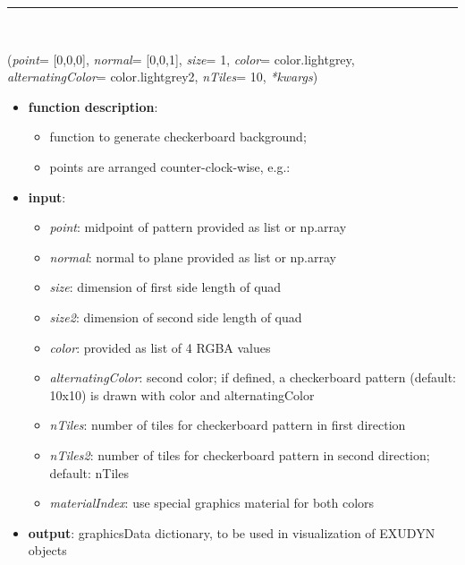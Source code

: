 \begin{itemize}[leftmargin=1.4cm]
\begin{itemize}[leftmargin=1.4cm]
\begin{itemize}[leftmargin=1.4cm]
\begin{itemize}[leftmargin=0.5cm]
\begin{itemize}[leftmargin=1.4cm]
\begin{itemize}[leftmargin=1.4cm]
\begin{itemize}[leftmargin=1.4cm]
\begin{itemize}[leftmargin=0.5cm]
\begin{itemize}[leftmargin=1.4cm]
%
\noindent\rule{8cm}{0.75pt}\vspace{1pt} \\ 
\begin{flushleft}
\label{sec:graphics:CheckerBoard}
({\it point}= [0,0,0], {\it normal}= [0,0,1], {\it size}= 1, {\it color}= color.lightgrey, {\it alternatingColor}= color.lightgrey2, {\it nTiles}= 10, {\it **kwargs})
\end{flushleft}
\setlength{\itemindent}{0.7cm}
\begin{itemize}[leftmargin=0.7cm]
\item[--]
{\bf function description}: \vspace{-6pt}
\begin{itemize}[leftmargin=1.2cm]
\setlength{\itemindent}{-0.7cm}
\item[]function to generate checkerboard background;
\item[]points are arranged counter-clock-wise, e.g.:
\end{itemize}
\item[--]
{\bf input}: \vspace{-6pt}
\begin{itemize}[leftmargin=1.2cm]
\setlength{\itemindent}{-0.7cm}
\item[]{\it point}: midpoint of pattern provided as list or np.array
\item[]{\it normal}: normal to plane provided as list or np.array
\item[]{\it size}: dimension of first side length of quad
\item[]{\it size2}: dimension of second side length of quad
\item[]{\it color}: provided as list of 4 RGBA values
\item[]{\it alternatingColor}: second color; if defined, a checkerboard pattern (default: 10x10) is drawn with color and alternatingColor
\item[]{\it nTiles}: number of tiles for checkerboard pattern in first direction
\item[]{\it nTiles2}: number of tiles for checkerboard pattern in second direction; default: nTiles
\item[]{\it materialIndex}: use special graphics material for both colors
\end{itemize}
\item[--]
{\bf output}: graphicsData dictionary, to be used in visualization of EXUDYN objects

\end{itemize}
\end{itemize}
\end{itemize}
\end{itemize}
\end{itemize}
\end{itemize}
\end{itemize}
\end{itemize}
\end{itemize}
\end{itemize}
